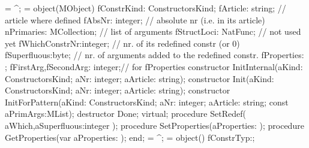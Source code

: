    = ^;
    = object(MObject)
    fConstrKind: ConstructorsKind;
    fArticle: string;           // article where defined
    fAbsNr: integer;            // absolute nr (i.e. in its article)
    nPrimaries: MCollection;    // list of arguments
    fStructLoci: NatFunc;       // not used yet
    fWhichConstrNr:integer;     // nr. of its redefined constr (or 0)
    fSuperfluous:byte;          // nr. of arguments added to the redefined constr.
    fProperties: ;
    fFirstArg,fSecondArg: integer;// for fProperties
   constructor InitInternal(aKind: ConstructorsKind; aNr: integer;
                            aArticle: string);
   constructor Init(aKind: ConstructorsKind; aNr: integer;
                    aArticle: string);
   constructor InitForPattern(aKind: ConstructorsKind; aNr: integer;
                              aArticle: string; const aPrimArgs:MList);
   destructor Done; virtual;
   procedure SetRedef( aWhich,aSuperfluous:integer );
   procedure SetProperties(aProperties: );
   procedure GetProperties(var aProperties: );
  end;
\eatline
{}\nwendcode{}\nwdocspar
\nwenddocs{}\endmoddef\nwstartdeflinemarkup{}\nwenddeflinemarkup
  = ^;
  =
  object()
    fConstrTyp:;
